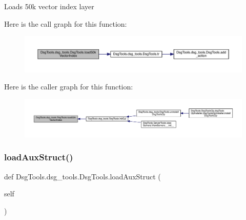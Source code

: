 \begin{DoxyVerb}Loads 50k vector index layer
\end{DoxyVerb}
 Here is the call graph for this function\+:
\nopagebreak
\begin{figure}[H]
\begin{center}
\leavevmode
\includegraphics[width=350pt]{class_dsg_tools_1_1dsg__tools_1_1_dsg_tools_af55fd850831c991ddd9e25af77bc8c97_cgraph}
\end{center}
\end{figure}
Here is the caller graph for this function\+:
\nopagebreak
\begin{figure}[H]
\begin{center}
\leavevmode
\includegraphics[width=350pt]{class_dsg_tools_1_1dsg__tools_1_1_dsg_tools_af55fd850831c991ddd9e25af77bc8c97_icgraph}
\end{center}
\end{figure}
\mbox{\label{class_dsg_tools_1_1dsg__tools_1_1_dsg_tools_a07e8c58d1e5497299d6c9e0e547ad429}} 
\subsubsection{\texorpdfstring{load\+Aux\+Struct()}{loadAuxStruct()}}
{\footnotesize\ttfamily def Dsg\+Tools.\+dsg\+\_\+tools.\+Dsg\+Tools.\+load\+Aux\+Struct (\begin{DoxyParamCaption}\item[{}]{self }\end{DoxyParamCaption})}

